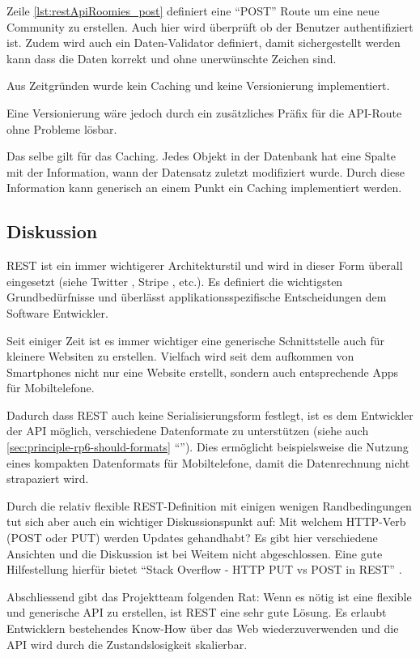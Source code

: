 Zeile \autoref{lst:restApiRoomies_post} definiert eine ``POST'' Route um eine neue Community zu erstellen. Auch hier wird überprüft ob der Benutzer authentifiziert ist. Zudem wird auch ein Daten-Validator definiert, damit sichergestellt werden kann dass die Daten korrekt und ohne unerwünschte Zeichen sind.


Aus Zeitgründen wurde kein Caching und keine Versionierung implementiert.

Eine Versionierung wäre jedoch durch ein zusätzliches Präfix für die API-Route ohne Probleme lösbar.

Das selbe gilt für das Caching. Jedes Objekt in der Datenbank hat eine Spalte mit der Information, wann der Datensatz zuletzt modifiziert wurde. Durch diese Information kann generisch an einem Punkt ein Caching implementiert werden.

\subsection*{Diskussion}

REST ist ein immer wichtigerer Architekturstil und wird in dieser Form überall eingesetzt (siehe Twitter \cite{TwitterAPI}, Stripe \cite{StripeAPI}, etc.). Es definiert die wichtigsten Grundbedürfnisse und überlässt applikationsspezifische Entscheidungen dem Software Entwickler.

Seit einiger Zeit ist es immer wichtiger eine generische Schnittstelle auch für kleinere Websiten zu erstellen. Vielfach wird seit dem aufkommen von Smartphones nicht nur eine Website erstellt, sondern auch entsprechende Apps für Mobiltelefone.

Dadurch dass REST auch keine Serialisierungsform festlegt, ist es dem Entwickler der API möglich, verschiedene Datenformate zu unterstützen (siehe auch \ref{sec:principle-rp6-should-formats} ``''). Dies ermöglicht beispielsweise die Nutzung eines kompakten Datenformats für Mobiltelefone, damit die Datenrechnung nicht strapaziert wird.

Durch die relativ flexible REST-Definition mit einigen wenigen Randbedingungen tut sich aber auch ein wichtiger Diskussionspunkt auf: Mit welchem HTTP-Verb (POST oder PUT) werden Updates gehandhabt? Es gibt hier verschiedene Ansichten und die Diskussion ist bei Weitem nicht abgeschlossen. Eine gute Hilfestellung hierfür bietet ``Stack Overflow - HTTP PUT vs POST in REST'' \cite{StackoverflowPUTvsPOST}.

Abschliessend gibt das Projektteam folgenden Rat: Wenn es nötig ist eine flexible und generische API zu erstellen, ist REST eine sehr gute Lösung. Es erlaubt Entwicklern bestehendes Know-How über das Web wiederzuverwenden und die API wird durch die Zustandslosigkeit skalierbar.